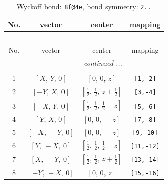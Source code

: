 \documentclass[fleqn,8pt]{jsarticle}
\begin{document}
\begin{longtable}{cccc}
\caption{Wyckoff bond: {\tt 8f@4e}, bond symmetry: {\tt 2..}}
 \\
 \hline \hline
No. & vector & center & mapping \\ \hline \endfirsthead

\multicolumn{3}{l}{\tablename\ \thetable{}} \\
 \hline \hline
No. & vector & center & mapping \\ \hline \endhead

 \hline \hline
\multicolumn{3}{r}{\footnotesize\it continued ...} \\ \endfoot

 \hline \hline
\multicolumn{3}{r}{} \\ \endlastfoot

1 & $\left[ X,\, Y,\, 0 \right]$ & $\left[ 0,\, 0,\, z \right]$ & {\tt [1,-2]} \\ \hline
2 & $\left[ - Y,\, X,\, 0 \right]$ & $\left[ \frac{1}{2},\, \frac{1}{2},\, z + \frac{1}{2} \right]$ & {\tt [3,-4]} \\ \hline
3 & $\left[ - X,\, Y,\, 0 \right]$ & $\left[ \frac{1}{2},\, \frac{1}{2},\, \frac{1}{2} - z \right]$ & {\tt [5,-6]} \\ \hline
4 & $\left[ Y,\, X,\, 0 \right]$ & $\left[ 0,\, 0,\, - z \right]$ & {\tt [7,-8]} \\ \hline
5 & $\left[ - X,\, - Y,\, 0 \right]$ & $\left[ 0,\, 0,\, - z \right]$ & {\tt [9,-10]} \\ \hline
6 & $\left[ Y,\, - X,\, 0 \right]$ & $\left[ \frac{1}{2},\, \frac{1}{2},\, \frac{1}{2} - z \right]$ & {\tt [11,-12]} \\ \hline
7 & $\left[ X,\, - Y,\, 0 \right]$ & $\left[ \frac{1}{2},\, \frac{1}{2},\, z + \frac{1}{2} \right]$ & {\tt [13,-14]} \\ \hline
8 & $\left[ - Y,\, - X,\, 0 \right]$ & $\left[ 0,\, 0,\, z \right]$ & {\tt [15,-16]} \\
\end{longtable}
\renewcommand{\arraystretch}{1.2}
\end{document}
